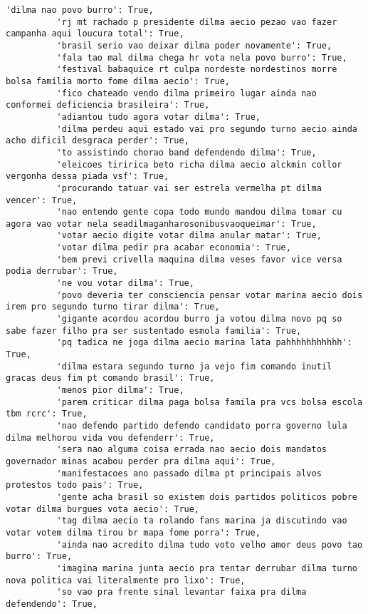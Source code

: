 \documentclass[11pt]{article}
\begin{document}
\begin{Verbatim}[commandchars=\\\{\}]
          'dilma nao povo burro': True,
          'rj mt rachado p presidente dilma aecio pezao vao fazer campanha aqui loucura total': True,
          'brasil serio vao deixar dilma poder novamente': True,
          'fala tao mal dilma chega hr vota nela povo burro': True,
          'festival babaquice rt culpa nordeste nordestinos morre bolsa familia morto fome dilma aecio': True,
          'fico chateado vendo dilma primeiro lugar ainda nao conformei deficiencia brasileira': True,
          'adiantou tudo agora votar dilma': True,
          'dilma perdeu aqui estado vai pro segundo turno aecio ainda acho dificil desgraca perder': True,
          'to assistindo chorao band defendendo dilma': True,
          'eleicoes tiririca beto richa dilma aecio alckmin collor vergonha dessa piada vsf': True,
          'procurando tatuar vai ser estrela vermelha pt dilma vencer': True,
          'nao entendo gente copa todo mundo mandou dilma tomar cu agora vao votar nela seadilmaganharosonibusvaoqueimar': True,
          'votar aecio digite votar dilma anular matar': True,
          'votar dilma pedir pra acabar economia': True,
          'bem previ crivella maquina dilma veses favor vice versa podia derrubar': True,
          'ne vou votar dilma': True,
          'povo deveria ter consciencia pensar votar marina aecio dois irem pro segundo turno tirar dilma': True,
          'gigante acordou acordou burro ja votou dilma novo pq so sabe fazer filho pra ser sustentado esmola familia': True,
          'pq tadica ne joga dilma aecio marina lata pahhhhhhhhhhh': True,
          'dilma estara segundo turno ja vejo fim comando inutil gracas deus fim pt comando brasil': True,
          'menos pior dilma': True,
          'parem criticar dilma paga bolsa famila pra vcs bolsa escola tbm rcrc': True,
          'nao defendo partido defendo candidato porra governo lula dilma melhorou vida vou defenderr': True,
          'sera nao alguma coisa errada nao aecio dois mandatos governador minas acabou perder pra dilma aqui': True,
          'manifestacoes ano passado dilma pt principais alvos protestos todo pais': True,
          'gente acha brasil so existem dois partidos politicos pobre votar dilma burgues vota aecio': True,
          'tag dilma aecio ta rolando fans marina ja discutindo vao votar votem dilma tirou br mapa fome porra': True,
          'ainda nao acredito dilma tudo voto velho amor deus povo tao burro': True,
          'imagina marina junta aecio pra tentar derrubar dilma turno nova politica vai literalmente pro lixo': True,
          'so vao pra frente sinal levantar faixa pra dilma defendendo': True,

\end{Verbatim}
\end{document}
